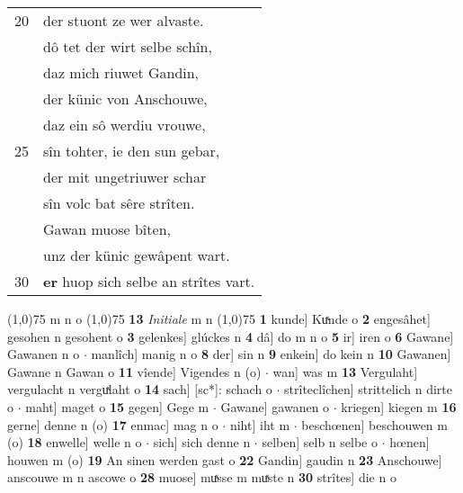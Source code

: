 \documentclass[8pt,a4paper,notitlepage]{article}
\begin{document}
\begin{table}[ht]
\begin{minipage}[t]{0.5\linewidth}
\begin{tabular}{rl}
20 & der stuont ze wer alvaste.\\ 
 & dô tet der wirt selbe schîn,\\ 
 & daz mich riuwet Gandin,\\ 
 & der künic von Anschouwe,\\ 
 & daz ein sô werdiu vrouwe,\\ 
25 & sîn tohter, ie den sun gebar,\\ 
 & der mit ungetriuwer schar\\ 
 & sîn volc bat sêre strîten.\\ 
 & Gawan muose bîten,\\ 
 & unz der künic gewâpent wart.\\ 
30 & \textbf{er} huop sich selbe an strîtes vart.\\ 
\end{tabular}
\scriptsize
\line(1,0){75} \newline
m n o \newline
\line(1,0){75} \newline
\textbf{13} \textit{Initiale} m n  \newline
\line(1,0){75} \newline
\textbf{1} kunde] Kuͯnde o \textbf{2} engesâhet] gesohen n gesohent o \textbf{3} gelenkes] glúckes n \textbf{4} dâ] do m n o \textbf{5} ir] iren o \textbf{6} Gawane] Gawanen n o  $\cdot$ manlîch] manig n o \textbf{8} der] sin n \textbf{9} enkein] do kein n \textbf{10} Gawanen] Gawane n Gawan o \textbf{11} vîende] Vigendes n (o)  $\cdot$ wan] was m \textbf{13} Vergulaht] vergulacht n verguͯlaht o \textbf{14} sach] [sc*]: schach o  $\cdot$ strîteclîchen] strittelich n dirte o  $\cdot$ maht] maget o \textbf{15} gegen] Gege m  $\cdot$ Gawane] gawanen o  $\cdot$ kriegen] kiegen m \textbf{16} gerne] denne n (o) \textbf{17} enmac] mag n o  $\cdot$ niht] iht m  $\cdot$ beschœnen] beschouwen m (o) \textbf{18} enwelle] welle n o  $\cdot$ sich] sich denne n  $\cdot$ selben] selb n selbe o  $\cdot$ hœnen] houwen m (o) \textbf{19} An sinen werden gast o \textbf{22} Gandin] gaudin n \textbf{23} Anschouwe] anscouwe m n ascowe o \textbf{28} muose] muͯsse m muͯste n \textbf{30} strîtes] die n o \newline
\end{minipage}
\end{table}
\newpage
\end{document}
